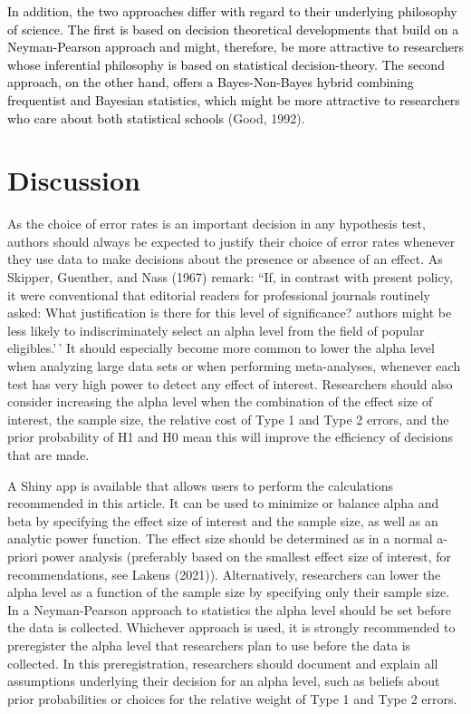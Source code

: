 \documentclass[
  english,
  ,man, a4paper,floatsintext]{apa6}
\begin{document}
\textcolor{black}{In addition, the two approaches differ with regard to their underlying philosophy of science. The first is based on decision theoretical developments that build on a Neyman-Pearson approach and might, therefore, be more attractive to researchers whose inferential philosophy is based on statistical decision-theory. The second approach, on the other hand, offers a Bayes-Non-Bayes hybrid combining frequentist and Bayesian statistics, which might be more attractive to researchers who care about both statistical schools} (Good, 1992).

\hypertarget{discussion}{%
\section{Discussion}\label{discussion}}

As the choice of error rates is an important decision in any hypothesis test, authors should always be expected to justify their choice of error rates whenever they use data to make decisions about the presence or absence of an effect. As Skipper, Guenther, and Nass (1967) remark: ``If, in contrast with present policy, it were conventional that editorial readers for professional journals routinely asked: What justification is there for this level of significance? authors might be less likely to indiscriminately select an alpha level from the field of popular eligibles.'\,' It should especially become more common to lower the alpha level when analyzing large data sets or when performing meta-analyses, whenever each test has very high power to detect any effect of interest. Researchers should also consider increasing the alpha level when the combination of the effect size of interest, the sample size, the relative cost of Type 1 and Type 2 errors, and the prior probability of H1 and H0 mean this will improve the efficiency of decisions that are made.

A Shiny app is available that allows users to perform the calculations recommended in this article. It can be used to minimize or balance alpha and beta by specifying the effect size of interest and the sample size, as well as an analytic power function. The effect size should be determined as in a normal a-priori power analysis (preferably based on the smallest effect size of interest, for recommendations, see Lakens (2021)). Alternatively, researchers can lower the alpha level as a function of the sample size by specifying only their sample size. In a Neyman-Pearson approach to statistics the alpha level should be set before the data is collected. Whichever approach is used, it is strongly recommended to preregister the alpha level that researchers plan to use before the data is collected. In this preregistration, researchers should document and explain all assumptions underlying their decision for an alpha level, such as beliefs about prior probabilities or choices for the relative weight of Type 1 and Type 2 errors.
\end{document}
